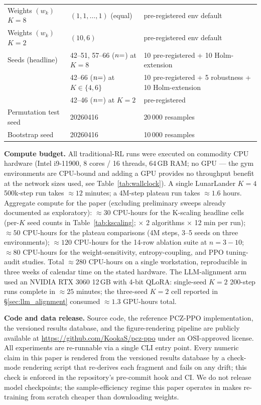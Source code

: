 \documentclass[11pt,a4paper]{article}
\DeclareRobustCommand{\cnum}[1]{\unskip}
\begin{document}
\begin{table}[H]
\begin{tabular}{lll}
Weights $(w_k)$ $K{=}8$ & $(1,1,\ldots,1)$ (equal) & pre-registered env default \\
Weights $(w_k)$ $K{=}2$ & $(10, 6)$ & pre-registered env default \\
\midrule
Seeds (headline) & 42--51, 57--66 ($n{=}\cnum{k8_pcz_seeds}$) at $K{=}8$ & 10 pre-registered + 10 Holm-extension \\
 & 42--66 ($n{=}\cnum{k4_pcz_seeds}$) at $K{\in}\{4,6\}$ & 10 pre-registered + 5 robustness + 10 Holm-extension \\
 & 42--46 ($n{=}\cnum{k2_pcz_seeds}$) at $K{=}2$ & pre-registered \\
Permutation test seed & 20260416 & 20\,000 resamples \\
Bootstrap seed & 20260416 & 10\,000 resamples \\
\bottomrule
\end{tabular}
\end{table}

\textbf{Compute budget.} All traditional-RL runs were executed on commodity CPU hardware (Intel i9-11900, 8 cores / 16 threads, 64\,GB RAM; no GPU --- the gym environments are CPU-bound and adding a GPU provides no throughput benefit at the network sizes used, see Table~\ref{tab:wallclock}). A single LunarLander $K{=}4$ 500k-step run takes $\approx\!12$ minutes; a 4M-step plateau run takes $\approx\!1.6$ hours. Aggregate compute for the paper (excluding preliminary sweeps already documented as exploratory): $\approx\!30$ CPU-hours for the K-scaling headline cells (per-$K$ seed counts in Table~\ref{tab:kscaling}; $\times$ 2 algorithms $\times$ 12 min per run); $\approx\!50$ CPU-hours for the plateau comparisons (4M steps, 3--5 seeds on three environments); $\approx\!120$ CPU-hours for the 14-row ablation suite at $n{=}3{-}10$; $\approx\!80$ CPU-hours for the weight-sensitivity, entropy-coupling, and PPO tuning-audit studies. Total $\approx\!280$ CPU-hours on a single workstation, reproducible in three weeks of calendar time on the stated hardware. The LLM-alignment arm used an NVIDIA RTX 3060 12\,GB with 4-bit QLoRA: single-seed $K{=}2$ 200-step runs complete in $\approx\!25$ minutes; the three-seed $K{=}2$ cell reported in §\ref{sec:llm_alignment} consumed $\approx\!1.3$ GPU-hours total.

\textbf{Code and data release.} Source code, the reference PCZ-PPO implementation, the versioned results database, and the figure-rendering pipeline are publicly available at \url{https://github.com/KookaS/pcz-ppo} under an OSI-approved license. All experiments are re-runnable via a single CLI entry point. Every numeric claim in this paper is rendered from the versioned results database by a check-mode rendering script that re-derives each fragment and fails on any drift; this check is enforced in the repository's pre-commit hook and CI. We do not release model checkpoints; the sample-efficiency regime this paper operates in makes re-training from scratch cheaper than downloading weights.
\end{document}

